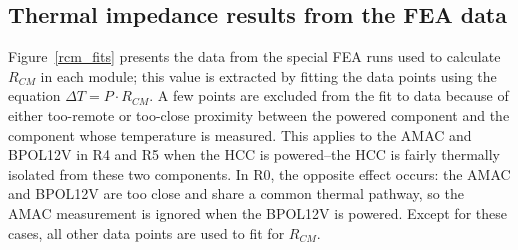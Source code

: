 \clearpage

\subsection{Thermal impedance results from the FEA data}

Figure~\ref{rcm_fits} presents the data from the special FEA runs used to calculate $R_{CM}$ in each
module; this value is extracted by fitting the data points using the equation
$\Delta T= P\cdot R_{CM}$. A few points are excluded from the fit to data because of either too-remote
or too-close
proximity between the powered component and the component whose temperature is measured. 
This applies to the AMAC and BPOL12V in R4 and R5 when the HCC is powered--the HCC is fairly thermally
isolated from these two components. In R0, the opposite effect occurs: the AMAC and BPOL12V are too
close and share a common thermal pathway, so the AMAC measurement is ignored when the BPOL12V is powered.
Except for these cases, all other data points are used to fit for $R_{CM}$.

